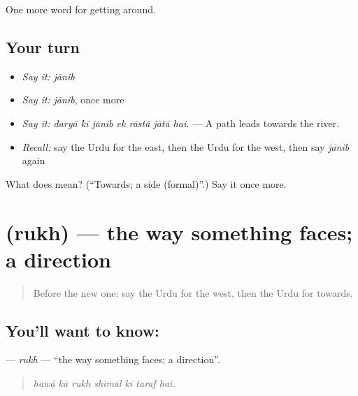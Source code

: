 \begin{grammarlens}[title={What you've built}]
One more word for getting around.
\end{grammarlens}

\subsection*{Your turn}
\begin{itemize}
\raggedright
  \item \emph{Say it:} \emph{jānib}
  \item \emph{Say it:} \emph{jānib}, once more
  \item \emph{Say it:} \emph{daryā kī jānib ek rāstā jātā hai.} — A path leads towards the river.
  \item \emph{Recall:} say the Urdu for the east, then the Urdu for the west, then say \emph{jānib} again
\end{itemize}

\begin{tcolorbox}[breakable,colback=teal!4,colframe=teal!35!black,title={Before you move on}]
What does  mean? (\textquotedblleft{}Towards; a side (formal)\textquotedblright{}.) Say it once more.
\end{tcolorbox}
\section[\texorpdfstring{\ur{رخ} (rukh)}{رخ (rukh)}]{ (rukh) — the way something faces; a direction}

\label{lesson:UR-C409-rukh}



\begin{quote}
Before the new one: say the Urdu for the west, then the Urdu for towards.
\end{quote}

\subsection*{You'll want to know: }
\textbf{} — \emph{rukh} — \textquotedblleft{}the way something faces; a direction\textquotedblright{}.

\begin{quote}
      
\end{quote}

\begin{quote}
\emph{hawā kā rukh shimāl kī taraf hai.}
\end{quote}

